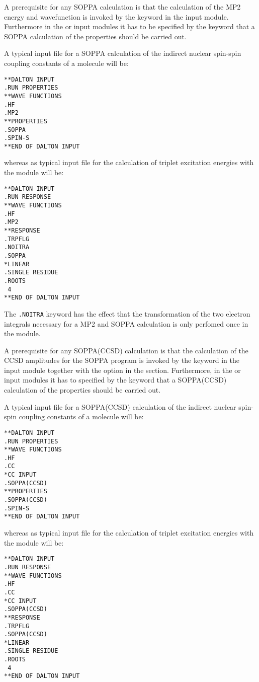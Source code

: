 A prerequisite for any SOPPA calculation is that the calculation of
the MP2 energy and wavefunction is invoked by the keyword  in
the  input module. Furthermore in the
 or  input modules it has to be specified 
by the keyword  that a SOPPA calculation of the properties
should be carried out.

A typical input file for a SOPPA calculation of the indirect nuclear
spin-spin coupling constants of a molecule will be:

\begin{verbatim}
**DALTON INPUT
.RUN PROPERTIES
**WAVE FUNCTIONS
.HF
.MP2
**PROPERTIES
.SOPPA
.SPIN-S
**END OF DALTON INPUT
\end{verbatim}
whereas as typical input file for the calculation of triplet
excitation energies with the
 module will be: 
\begin{verbatim}
**DALTON INPUT
.RUN RESPONSE
**WAVE FUNCTIONS
.HF
.MP2
**RESPONSE
.TRPFLG
.NOITRA
.SOPPA
*LINEAR
.SINGLE RESIDUE
.ROOTS
 4
**END OF DALTON INPUT
\end{verbatim}
The {\tt .NOITRA} keyword has the effect that the transformation of the two 
electron integrals necessary for a MP2 and SOPPA calculation is only perfomed
once in the  module.

A prerequisite for any SOPPA(CCSD) calculation is that the calculation of
the CCSD amplitudes for the SOPPA program is invoked by the keyword 
in the  input module together with the 
option in the  section. Furthermore, in the  or
 input modules it has to specified by the keyword 
that a SOPPA(CCSD) calculation of the properties should be carried out. 

A typical input file for a SOPPA(CCSD) calculation of the indirect nuclear
spin-spin coupling constants of a molecule will be:

\begin{verbatim}
**DALTON INPUT
.RUN PROPERTIES
**WAVE FUNCTIONS
.HF
.CC
*CC INPUT
.SOPPA(CCSD)
**PROPERTIES
.SOPPA(CCSD)
.SPIN-S
**END OF DALTON INPUT
\end{verbatim}
whereas as typical input file for the calculation of triplet
excitation energies with the
 module will be: 
\begin{verbatim}
**DALTON INPUT
.RUN RESPONSE
**WAVE FUNCTIONS
.HF
.CC
*CC INPUT
.SOPPA(CCSD)
**RESPONSE
.TRPFLG
.SOPPA(CCSD)
*LINEAR
.SINGLE RESIDUE
.ROOTS
 4
**END OF DALTON INPUT
\end{verbatim}


